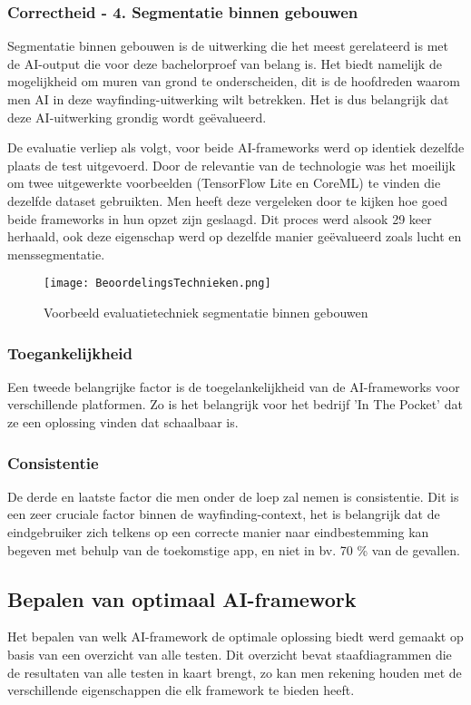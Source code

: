 \subsubsection{Correctheid - 4. Segmentatie binnen gebouwen}
Segmentatie binnen gebouwen is de uitwerking die het meest gerelateerd is met de AI-output die voor deze bachelorproef van belang is. Het biedt namelijk de mogelijkheid om muren van grond te onderscheiden, dit is de hoofdreden waarom men AI in deze wayfinding-uitwerking wilt betrekken. Het is dus belangrijk dat deze AI-uitwerking grondig wordt geëvalueerd.

De evaluatie verliep als volgt, voor beide AI-frameworks werd op identiek dezelfde plaats de test uitgevoerd. Door de relevantie van de technologie was het moeilijk om twee uitgewerkte voorbeelden (TensorFlow Lite en CoreML) te vinden die dezelfde dataset gebruikten. Men heeft deze vergeleken door te kijken hoe goed beide frameworks in hun opzet zijn geslaagd. Dit proces werd alsook 29 keer herhaald, ook deze eigenschap werd op dezelfde manier geëvalueerd zoals lucht en menssegmentatie.
\begin{figure}[H]
	\centering
	\texttt{[image: BeoordelingsTechnieken.png]}
	\caption{Voorbeeld evaluatietechniek segmentatie binnen gebouwen}
\end{figure}

\subsubsection{Toegankelijkheid}
Een tweede belangrijke factor is de toegelankelijkheid van de AI-frameworks voor verschillende platformen. Zo is het belangrijk voor het bedrijf 'In The Pocket' dat ze een oplossing vinden dat schaalbaar is.

\subsubsection{Consistentie}
De derde en laatste factor die men onder de loep zal nemen is consistentie. Dit is een zeer cruciale factor binnen de wayfinding-context, het is belangrijk dat de eindgebruiker zich telkens op een correcte manier naar eindbestemming kan begeven met behulp van de toekomstige app, en niet in bv. 70 \% van de gevallen.

\subsection{Bepalen van optimaal AI-framework}
Het bepalen van welk AI-framework de optimale oplossing biedt werd gemaakt op basis van een overzicht van alle testen. Dit overzicht bevat staafdiagrammen die de resultaten van alle testen in kaart brengt, zo kan men rekening houden met de verschillende eigenschappen die elk framework te bieden heeft.

